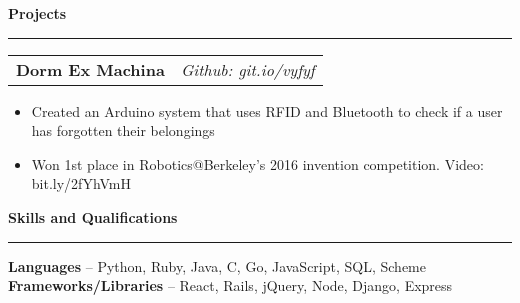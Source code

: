 \documentclass[11pt,letterpaper]{article}
\makeatletter
\newenvironment{topic}[1]
    {
    {\Large \centerline{#1}}
    \vspace*{0.03in}
    \hrule 
    \vspace*{0.05in}
    }
    {}
\newenvironment{event}
    {
    \begin{tabular*}{\textwidth}{l@{\extracolsep{\fill}}r}
    }
    {
    \end{tabular*}
    }
\newenvironment{detail}
    {
    \normalsize
    }
    {
    \vspace*{0.02in}
    }
\makeatother
\begin{document}
\begin{topic}{\textbf{Projects}}
        \begin{event}
            \textbf{Dorm Ex Machina} & \emph{Github: git.io/vyfyf}
        \end{event}
            \begin{itemize}
                \item Created an Arduino system that uses RFID and Bluetooth to check if a user has forgotten their belongings
                \item Won 1st place in Robotics@Berkeley's 2016 invention competition. Video: bit.ly/2fYhVmH
            \end{itemize}
        
    \end{topic} \vspace*{0.1in}


    \begin{topic}{\textbf{Skills and Qualifications}}
        \begin{detail}
            \textbf{Languages} -- Python, Ruby, Java, C, Go, JavaScript, SQL, Scheme \\
            \textbf{Frameworks/Libraries} -- React, Rails, jQuery, Node, Django, Express 
        \end{detail}
    \end{topic}
\end{document}
